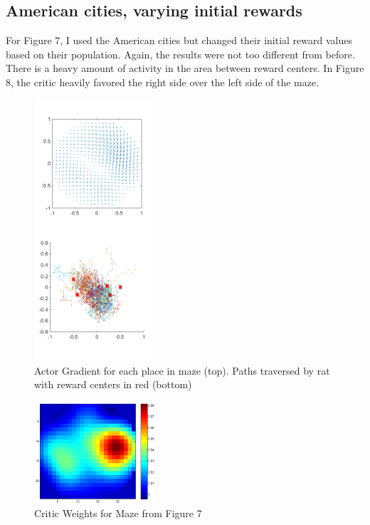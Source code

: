 \documentclass[conference]{IEEEtran}
\begin{document}
\subsection{American cities, varying initial rewards}

For Figure 7, I used the American cities but changed their initial reward values based on their population. Again, the results were not too different from before. There is a heavy amount of activity in the area between reward centers. In Figure 8, the critic heavily favored the right side over the left side of the maze.

\begin{figure}
\includegraphics[width=0.4\textwidth]{waterMazeRevisedD_Figure_populationRewards.png} 
\caption{Actor Gradient for each place in maze (top). Paths traversed by rat with reward centers in red (bottom)}
\end{figure}

\begin{figure}
\includegraphics[width=0.4\textwidth]{waterMazeRevisedD_Critic_populationRewards.png} 
\caption{Critic Weights for Maze from Figure 7}
\end{figure}
\end{document}

